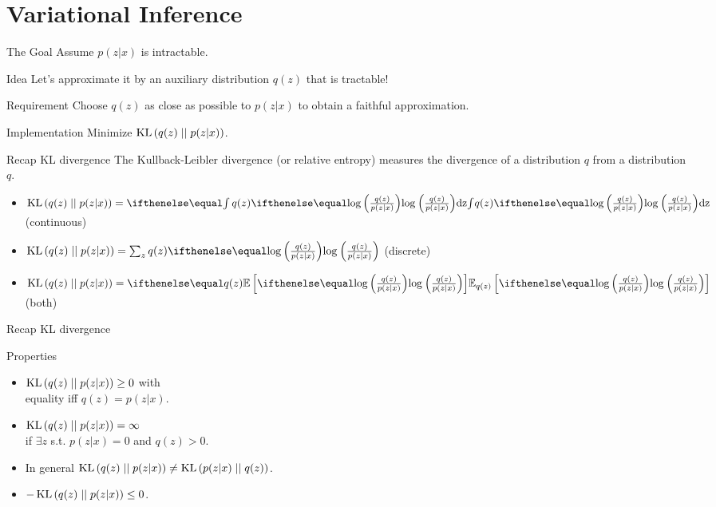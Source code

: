 \documentclass[14pt]{beamer}
\begin{document}
\section{Variational Inference}

\begin{frame}{The Goal}
Assume $ p(z|x) $ is intractable.
\pause
\begin{block}{Idea}
Let's approximate it by an auxiliary distribution $ q(z) $ that is tractable!
\end{block}
\pause
\begin{block}{Requirement}
Choose $ q(z) $ as close as possible to $ p(z|x) $ to obtain a faithful approximation.
\end{block}
\pause
\begin{block}{Implementation}
Minimize $ \operatorname{KL}\left(q(z)\mid\mid p(z|x)\right) $.
\end{block}
\end{frame}

\begin{frame}{Recap KL divergence}
The Kullback-Leibler divergence (or relative entropy) measures the divergence of a distribution $ q $ from 
a distribution $ q $. 
\begin{itemize}
\item $ \KL{q(z)}{p(z|x)} = \intl{ q(z) \loga{\frac{q(z)}{p(z|x)}}}{z} $ (continuous)
\item $ \KL{q(z)}{p(z|x)} = \sum_{z} q(z) \loga{\frac{q(z)}{p(z|x)}} $ (discrete)
\item $ \KL{q(z)}{p(z|x)} = \E[q(z)]{\loga{\frac{q(z)}{p(z|x)}}} $ (both)
\end{itemize}
\end{frame}

\begin{frame}{Recap KL divergence}
\begin{block}{Properties}
\begin{itemize}
\item $ \operatorname{KL}\left(q(z)\mid\mid p(z|x)\right) \geq 0 $ with \\ equality iff $ q(z) = p(z|x) $.
\pause
\item $ \operatorname{KL}\left(q(z)\mid\mid p(z|x)\right) = \infty $ \\ if $ \exists z $ s.t. $ p(z|x) = 0 $ and $ q(z) > 0 $.
\pause
\item In general $ \operatorname{KL}\left(q(z)\mid\mid p(z|x)\right) \not = \operatorname{KL}\left(p(z|x)\mid\mid q(z)\right) $.
\pause
\item $ -\operatorname{KL}\left(q(z)\mid\mid p(z|x)\right) \leq 0 $.
\end{itemize}
\end{block}
\end{frame}
\end{document}
